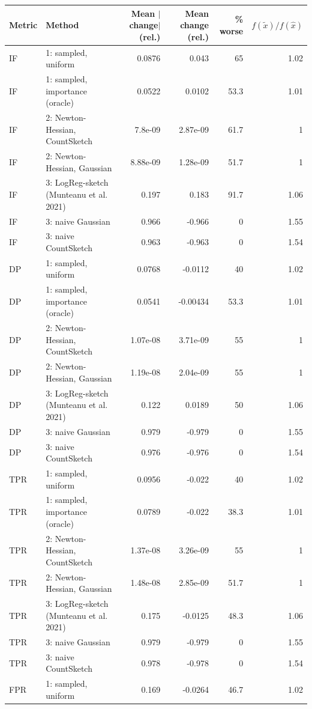 \begin{table}[t]
\centering
\small
\begin{tabular}{llrrrr}
\toprule
Metric & Method & Mean $|$change$|$ (rel.) & Mean change (rel.) & \% worse & $f(\tilde x)/f(\hat x)$ \\
\midrule
IF & 1: sampled, uniform & 0.0876 & 0.043 & 65 & 1.02 \\
IF & 1: sampled, importance (oracle) & 0.0522 & 0.0102 & 53.3 & 1.01 \\
IF & 2: Newton-Hessian, CountSketch & 7.8e-09 & 2.87e-09 & 61.7 & 1 \\
IF & 2: Newton-Hessian, Gaussian & 8.88e-09 & 1.28e-09 & 51.7 & 1 \\
IF & 3: LogReg-sketch (Munteanu et al. 2021) & 0.197 & 0.183 & 91.7 & 1.06 \\
IF & 3: naive Gaussian & 0.966 & -0.966 & 0 & 1.55 \\
IF & 3: naive CountSketch & 0.963 & -0.963 & 0 & 1.54 \\
\midrule
DP & 1: sampled, uniform & 0.0768 & -0.0112 & 40 & 1.02 \\
DP & 1: sampled, importance (oracle) & 0.0541 & -0.00434 & 53.3 & 1.01 \\
DP & 2: Newton-Hessian, CountSketch & 1.07e-08 & 3.71e-09 & 55 & 1 \\
DP & 2: Newton-Hessian, Gaussian & 1.19e-08 & 2.04e-09 & 55 & 1 \\
DP & 3: LogReg-sketch (Munteanu et al. 2021) & 0.122 & 0.0189 & 50 & 1.06 \\
DP & 3: naive Gaussian & 0.979 & -0.979 & 0 & 1.55 \\
DP & 3: naive CountSketch & 0.976 & -0.976 & 0 & 1.54 \\
\midrule
TPR & 1: sampled, uniform & 0.0956 & -0.022 & 40 & 1.02 \\
TPR & 1: sampled, importance (oracle) & 0.0789 & -0.022 & 38.3 & 1.01 \\
TPR & 2: Newton-Hessian, CountSketch & 1.37e-08 & 3.26e-09 & 55 & 1 \\
TPR & 2: Newton-Hessian, Gaussian & 1.48e-08 & 2.85e-09 & 51.7 & 1 \\
TPR & 3: LogReg-sketch (Munteanu et al. 2021) & 0.175 & -0.0125 & 48.3 & 1.06 \\
TPR & 3: naive Gaussian & 0.979 & -0.979 & 0 & 1.55 \\
TPR & 3: naive CountSketch & 0.978 & -0.978 & 0 & 1.54 \\
\midrule
FPR & 1: sampled, uniform & 0.169 & -0.0264 & 46.7 & 1.02 \\

\end{tabular}
\end{table}
